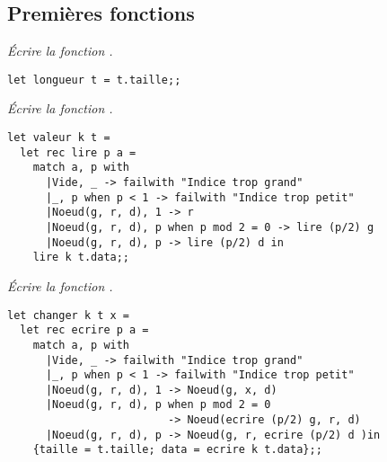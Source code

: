 \subsection{Premières fonctions}
\begin{Exercise}[title = Taille]\it 
Écrire la fonction .
\end{Exercise}
\begin{Answer}
\begin{lstlisting}
let longueur t = t.taille;;
\end{lstlisting}
\end{Answer}
\begin{Exercise}[title = Accès]\it 
Écrire la fonction .
\end{Exercise}
\begin{Answer}
\begin{lstlisting}
let valeur k t =
  let rec lire p a =
    match a, p with
      |Vide, _ -> failwith "Indice trop grand"
      |_, p when p < 1 -> failwith "Indice trop petit"
      |Noeud(g, r, d), 1 -> r
      |Noeud(g, r, d), p when p mod 2 = 0 -> lire (p/2) g
      |Noeud(g, r, d), p -> lire (p/2) d in
    lire k t.data;;
\end{lstlisting}
\end{Answer}
\begin{Exercise}[title = Modification]\it 
Écrire la fonction .
\end{Exercise}
\begin{Answer}
\begin{lstlisting}
let changer k t x =
  let rec ecrire p a =
    match a, p with
      |Vide, _ -> failwith "Indice trop grand"
      |_, p when p < 1 -> failwith "Indice trop petit"
      |Noeud(g, r, d), 1 -> Noeud(g, x, d)
      |Noeud(g, r, d), p when p mod 2 = 0 
                         -> Noeud(ecrire (p/2) g, r, d) 
      |Noeud(g, r, d), p -> Noeud(g, r, ecrire (p/2) d )in
    {taille = t.taille; data = ecrire k t.data};;
\end{lstlisting}
\end{Answer}
